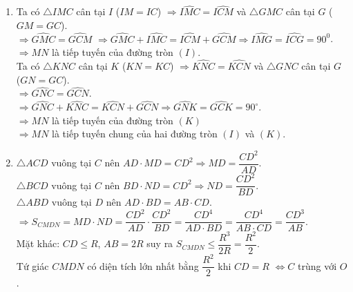 \begin{ex}
{\begin{enumerate}
		Tứ giác $CMDN$ có $\widehat{CM D}=\widehat{ADB}=\widehat{CN D}=90^0$ nên $CMDN$ là hình chữ nhật.\\
		Gọi $G$ là giao điểm của $MN$ và $CD$ suy ra $GC=GD=GM=GN\Rightarrow$ bốn điểm $C$, $M$, $D$, $N$ cùng thuộc một đường tròn tâm $G$.
		\item Ta có $\triangle IMC$ cân tại $I$ ($IM=IC$) $\Rightarrow \widehat{IMC}=\widehat{ICM}$ 		và $\triangle GMC$ cân tại $G$ ($GM=GC$).\\ 
		$\Rightarrow \widehat{GMC}=\widehat{GCM}$ $\Rightarrow \widehat{GMC}+\widehat{IMC}=\widehat{ICM}+\widehat{GCM}\Rightarrow \widehat{IMG}=\widehat{ICG}=90^0$.\\
		$\Rightarrow MN$ là tiếp tuyến của đường tròn $(I)$.\\
		Ta có $\triangle KNC$ cân tại $K$ ($KN=KC$) $\Rightarrow \widehat{KNC}=\widehat{KCN}$ và $\triangle GNC$ cân tại $G$ ($GN=GC$).\\
		$\Rightarrow \widehat{GNC}=\widehat{GCN}$.\\
		$\Rightarrow \widehat{GNC}+\widehat{KNC}=\widehat{KCN}+\widehat{GCN}\Rightarrow \widehat{GNK}=\widehat{GCK}=90^\circ$.\\
		$\Rightarrow MN$ là tiếp tuyến của đường tròn $(K)$\\
		$\Rightarrow MN$ là tiếp tuyến chung của hai đường tròn $(I)$ và $(K)$.
		\item $\triangle AC D$ vuông tại $C$ nên $AD\cdot M D=CD^2\Rightarrow MD=\dfrac{CD^2}{AD}$.\\
		$\triangle BCD$ vuông tại $C$ nên $BD\cdot ND=CD^2\Rightarrow ND=\dfrac{CD^2}{BD}$.\\
		$\triangle ABD$ vuông tại $D$ nên $AD\cdot BD=AB\cdot CD$.\\
		$\Rightarrow {S}_{CMDN}=MD\cdot ND=\dfrac{CD^2}{AD}\cdot \dfrac{CD^2}{BD}=\dfrac{CD^4}{AD\cdot BD}=\dfrac{CD^4}{AB\cdot CD}=\dfrac{CD^3}{AB}$.\\
		Mặt khác: $CD\leq R$, $AB=2R$ suy ra ${S}_{CM DN}\leq \dfrac{R^3}{2R}=\dfrac{R^2}{2}$.\\
		Tứ giác $CMDN$ có diện tích lớn nhất bằng $\dfrac{R^2}{2}$ khi $CD=R$ $\Leftrightarrow C$ trùng với $O$.
	\end{enumerate}
}
\end{ex}
